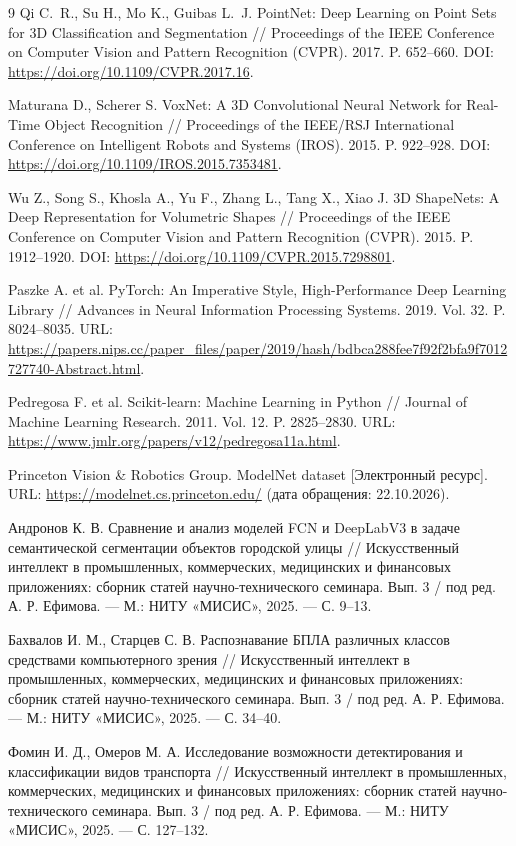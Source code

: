 \documentclass{misisarticle}
\begin{document}
\begin{thebibliography}{9}
Qi C.~R., Su H., Mo K., Guibas L.~J. PointNet: Deep Learning on Point Sets for 3D Classification and Segmentation // Proceedings of the IEEE Conference on Computer Vision and Pattern Recognition (CVPR). 2017. P. 652–660. DOI: \url{https://doi.org/10.1109/CVPR.2017.16}.

Maturana D., Scherer S. VoxNet: A 3D Convolutional Neural Network for Real-Time Object Recognition // Proceedings of the IEEE/RSJ International Conference on Intelligent Robots and Systems (IROS). 2015. P. 922–928. DOI: \url{https://doi.org/10.1109/IROS.2015.7353481}.

Wu Z., Song S., Khosla A., Yu F., Zhang L., Tang X., Xiao J. 3D ShapeNets: A Deep Representation for Volumetric Shapes // Proceedings of the IEEE Conference on Computer Vision and Pattern Recognition (CVPR). 2015. P. 1912–1920. DOI: \url{https://doi.org/10.1109/CVPR.2015.7298801}.

Paszke A. et al. PyTorch: An Imperative Style, High-Performance Deep Learning Library // Advances in Neural Information Processing Systems. 2019. Vol. 32. P. 8024–8035. URL: \url{https://papers.nips.cc/paper_files/paper/2019/hash/bdbca288fee7f92f2bfa9f7012727740-Abstract.html}.

Pedregosa F. et al. Scikit-learn: Machine Learning in Python // Journal of Machine Learning Research. 2011. Vol. 12. P. 2825–2830. URL: \url{https://www.jmlr.org/papers/v12/pedregosa11a.html}.

Princeton Vision \& Robotics Group. ModelNet dataset [Электронный ресурс]. URL: \url{https://modelnet.cs.princeton.edu/} (дата обращения: 22.10.2026).

Андронов К. В. Сравнение и анализ моделей FCN и DeepLabV3 в задаче семантической сегментации объектов городской улицы // Искусственный интеллект в промышленных, коммерческих, медицинских и финансовых приложениях: сборник статей научно-технического семинара. Вып. 3 / под ред. А. Р. Ефимова. — М.: НИТУ «МИСИС», 2025. — С. 9–13.

Бахвалов И. М., Старцев С. В. Распознавание БПЛА различных классов средствами компьютерного зрения // Искусственный интеллект в промышленных, коммерческих, медицинских и финансовых приложениях: сборник статей научно-технического семинара. Вып. 3 / под ред. А. Р. Ефимова. — М.: НИТУ «МИСИС», 2025. — С. 34–40.

Фомин И. Д., Омеров М. А. Исследование возможности детектирования и классификации видов транспорта // Искусственный интеллект в промышленных, коммерческих, медицинских и финансовых приложениях: сборник статей научно-технического семинара. Вып. 3 / под ред. А. Р. Ефимова. — М.: НИТУ «МИСИС», 2025. — С. 127–132.
\end{thebibliography}
\end{document}
